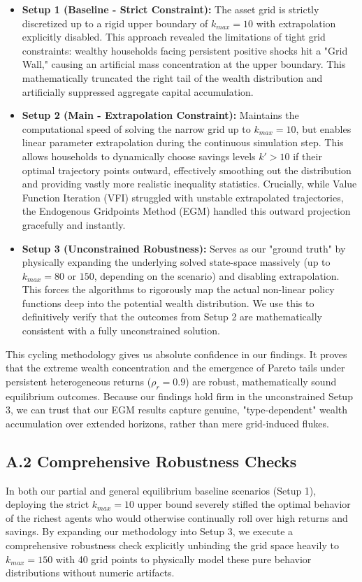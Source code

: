 \documentclass[11pt, a4paper]{article}
\begin{document}
\begin{itemize}
    \item \textbf{Setup 1 (Baseline - Strict Constraint):} The asset grid is strictly discretized up to a rigid upper boundary of $k_{max}=10$ with extrapolation explicitly disabled. This approach revealed the limitations of tight grid constraints: wealthy households facing persistent positive shocks hit a "Grid Wall," causing an artificial mass concentration at the upper boundary. This mathematically truncated the right tail of the wealth distribution and artificially suppressed aggregate capital accumulation.
    
    \item \textbf{Setup 2 (Main - Extrapolation Constraint):} Maintains the computational speed of solving the narrow grid up to $k_{max}=10$, but enables linear parameter extrapolation during the continuous simulation step. This allows households to dynamically choose savings levels $k' > 10$ if their optimal trajectory points outward, effectively smoothing out the distribution and providing vastly more realistic inequality statistics. Crucially, while Value Function Iteration (VFI) struggled with unstable extrapolated trajectories, the Endogenous Gridpoints Method (EGM) handled this outward projection gracefully and instantly.
    
    \item \textbf{Setup 3 (Unconstrained Robustness):} Serves as our "ground truth" by physically expanding the underlying solved state-space massively (up to $k_{max}=80$ or $150$, depending on the scenario) and disabling extrapolation. This forces the algorithms to rigorously map the actual non-linear policy functions deep into the potential wealth distribution. We use this to definitively verify that the outcomes from Setup 2 are mathematically consistent with a fully unconstrained solution.
\end{itemize}

This cycling methodology gives us absolute confidence in our findings. It proves that the extreme wealth concentration and the emergence of Pareto tails under persistent heterogeneous returns ($\rho_r=0.9$) are robust, mathematically sound equilibrium outcomes. Because our findings hold firm in the unconstrained Setup 3, we can trust that our EGM results capture genuine, "type-dependent" wealth accumulation over extended horizons, rather than mere grid-induced flukes.


\subsection*{A.2 Comprehensive Robustness Checks}
In both our partial and general equilibrium baseline scenarios (Setup 1), deploying the strict $k_{max}=10$ upper bound severely stifled the optimal behavior of the richest agents who would otherwise continually roll over high returns and savings. By expanding our methodology into Setup 3, we execute a comprehensive robustness check explicitly unbinding the grid space heavily to $k_{max}=150$ with 40 grid points to physically model these pure behavior distributions without numeric artifacts.
\end{document}
